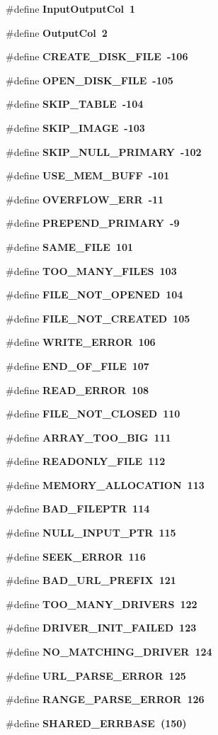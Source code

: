 \begin{CompactItemize}
\#define \bf{Input\-Output\-Col}~1
\item 
\#define \bf{Output\-Col}~2
\item 
\#define \bf{CREATE\_\-DISK\_\-FILE}~-106
\item 
\#define \bf{OPEN\_\-DISK\_\-FILE}~-105
\item 
\#define \bf{SKIP\_\-TABLE}~-104
\item 
\#define \bf{SKIP\_\-IMAGE}~-103
\item 
\#define \bf{SKIP\_\-NULL\_\-PRIMARY}~-102
\item 
\#define \bf{USE\_\-MEM\_\-BUFF}~-101
\item 
\#define \bf{OVERFLOW\_\-ERR}~-11
\item 
\#define \bf{PREPEND\_\-PRIMARY}~-9
\item 
\#define \bf{SAME\_\-FILE}~101
\item 
\#define \bf{TOO\_\-MANY\_\-FILES}~103
\item 
\#define \bf{FILE\_\-NOT\_\-OPENED}~104
\item 
\#define \bf{FILE\_\-NOT\_\-CREATED}~105
\item 
\#define \bf{WRITE\_\-ERROR}~106
\item 
\#define \bf{END\_\-OF\_\-FILE}~107
\item 
\#define \bf{READ\_\-ERROR}~108
\item 
\#define \bf{FILE\_\-NOT\_\-CLOSED}~110
\item 
\#define \bf{ARRAY\_\-TOO\_\-BIG}~111
\item 
\#define \bf{READONLY\_\-FILE}~112
\item 
\#define \bf{MEMORY\_\-ALLOCATION}~113
\item 
\#define \bf{BAD\_\-FILEPTR}~114
\item 
\#define \bf{NULL\_\-INPUT\_\-PTR}~115
\item 
\#define \bf{SEEK\_\-ERROR}~116
\item 
\#define \bf{BAD\_\-URL\_\-PREFIX}~121
\item 
\#define \bf{TOO\_\-MANY\_\-DRIVERS}~122
\item 
\#define \bf{DRIVER\_\-INIT\_\-FAILED}~123
\item 
\#define \bf{NO\_\-MATCHING\_\-DRIVER}~124
\item 
\#define \bf{URL\_\-PARSE\_\-ERROR}~125
\item 
\#define \bf{RANGE\_\-PARSE\_\-ERROR}~126
\item 
\#define \bf{SHARED\_\-ERRBASE}~(150)
\item 

\end{CompactItemize}
